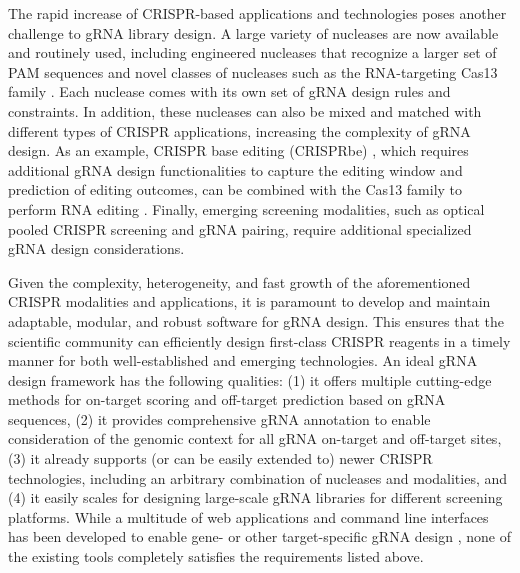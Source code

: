 \documentclass[pdftex,english,10pt]{article}
\begin{document}
The rapid increase of CRISPR-based applications and technologies poses another challenge to gRNA library design.
A large variety of nucleases are now available and routinely used, including engineered nucleases that recognize a larger set of PAM sequences  \citep{xcas9,spcas9ng, spg, enpamgb} and novel classes of nucleases such as the RNA-targeting Cas13 family \citep{c2c2_1, c2c2_2,cas13d}. Each nuclease comes with its own set of gRNA design rules and constraints. In addition, these nucleases can also be mixed and matched with different types of CRISPR applications, increasing the complexity of gRNA design. As an example, CRISPR base editing (CRISPRbe) \citep{gaudelli,komor}, which requires additional gRNA design functionalities to capture the editing window and prediction of editing outcomes, can be combined with the Cas13 family to perform RNA editing \citep{rnaediting1}. Finally, emerging screening modalities, such as optical pooled CRISPR screening \citep{ops} and gRNA pairing, require additional specialized gRNA design considerations. 


Given the complexity, heterogeneity, and fast growth of the aforementioned CRISPR modalities and applications, it is paramount to develop and maintain adaptable, modular, and robust software for gRNA design. This ensures that the scientific community can efficiently design first-class CRISPR reagents in a timely manner for both well-established and emerging technologies. An ideal gRNA design framework has the following qualities: (1) it offers multiple cutting-edge methods for on-target scoring and off-target prediction based on gRNA sequences, (2) it provides comprehensive gRNA annotation to enable consideration of the genomic context for all gRNA on-target and off-target sites, (3) it already supports (or can be easily extended to) newer CRISPR technologies, including an arbitrary combination of nucleases and modalities, and (4) it easily scales for designing large-scale gRNA libraries for different screening platforms. 
While a multitude of web applications and command line interfaces has been developed to enable gene- or other target-specific gRNA design \citep{ecrisp,crisprscan,guidescan,casoffinder, chopchop, crispor, cctop, flashfry,cld,multicrispr, crisprseek}, none of the existing tools completely satisfies the requirements listed above.
\end{document}
